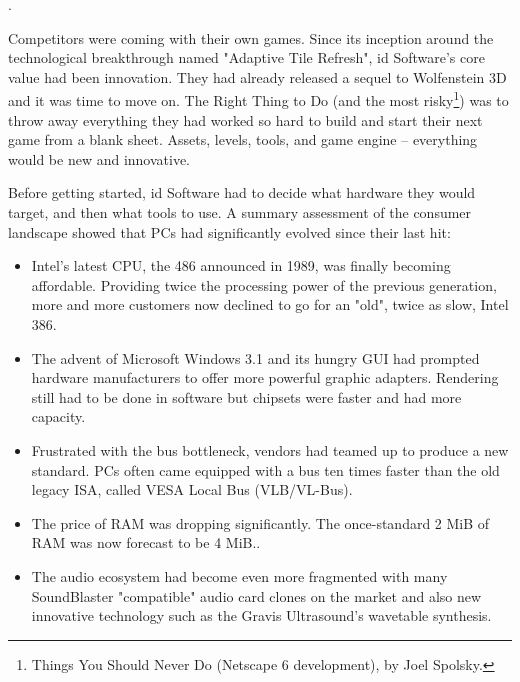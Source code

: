 \par
{}. \\
\par
Competitors were coming with their own games. Since its inception around the technological breakthrough named "Adaptive Tile Refresh", id Software's core value had been innovation. They had already released a sequel to Wolfenstein 3D and it was time to move on. The Right Thing to Do (and the most risky\footnote{Things You Should Never Do (Netscape 6 development), by Joel Spolsky.}) was to throw away everything they had worked so hard to build and start their next game from a blank sheet. Assets, levels, tools, and game engine -- everything would be new and innovative.\\
\par
Before getting started, id Software had to decide what hardware they would target, and then what tools to use. A summary assessment of the consumer landscape showed that PCs had significantly evolved since their last hit:
\begin{itemize}
\item Intel's latest CPU, the 486 announced in 1989, was finally becoming affordable. Providing twice the processing power of the previous generation, more and more customers now declined to go for an "old", twice as slow, Intel 386. 
\item The advent of Microsoft Windows 3.1 and its hungry GUI had prompted hardware manufacturers to offer more powerful graphic adapters. Rendering still had to be done in software but chipsets were faster and had more capacity.
\item Frustrated with the bus bottleneck, vendors had teamed up to produce a new standard. PCs often came equipped with a bus ten times faster than the old legacy ISA, called VESA Local Bus (VLB/VL-Bus). 
\item The price of RAM was dropping significantly. The once-standard 2 MiB of RAM was now forecast to be 4 MiB..
\item The audio ecosystem had become even more fragmented with many SoundBlaster "compatible" audio card clones on the market and also new innovative technology such as the Gravis Ultrasound's wavetable synthesis.\\
\end{itemize}
 \par 
